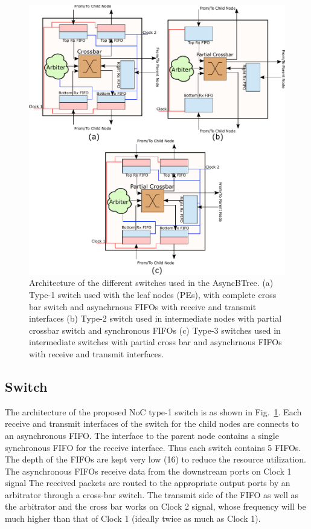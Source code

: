 \begin{figure}[t]
\centering
   \includegraphics[width=\columnwidth]{Figures/switch1_2.pdf}
   \caption{Architecture of the different switches used in the AsyncBTree. (a) Type-1 switch used with the leaf nodes (PEs), with complete cross bar switch and asynchrnous 
   FIFOs with receive and transmit interfaces (b) Type-2 switch used in intermediate nodes with partial crossbar switch and synchronous FIFOs (c) Type-3 switches used in intermediate
   switches with partial cross bar and asynchrnous FIFOs with receive and transmit interfaces.}
   \label{fig:switchArch}
\end{figure}

\subsection{Switch}
\label{sec:switch}
The architecture of the proposed NoC type-1 switch is as shown in Fig.~\ref{fig:switchArch}.
Each receive and transmit interfaces of the switch for the child nodes are connects to an asynchronous FIFO.
The interface to the parent node contains a single synchronous FIFO for the receive interface.
Thus each switch contains 5 FIFOs.
The depth of the FIFOs are kept very low (16) to reduce the resource utilization.
The asynchronous FIFOs receive data from the downstream ports on Clock 1 signal
The received packets are routed to the appropriate output ports by an arbitrator through a cross-bar switch.
The transmit side of the FIFO as well as the arbitrator and the cross bar works on Clock 2 signal, whose frequency will be much higher than that of Clock 1 (ideally twice as much as Clock 1).

